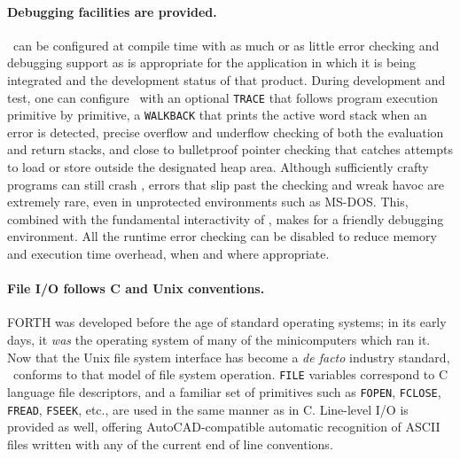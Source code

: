 \documentclass[twocolumn]{article}
\begin{document}
\paragraph{Debugging facilities are provided.}  \atlast\ can be
configured at compile time with as much or as little error checking
and debugging support as is appropriate for the application in which
it is being integrated and the development status of that product.
During development and test, one can configure \atlast\ with an
optional {\tt TRACE} that follows program execution primitive by
primitive, a {\tt WALKBACK} that prints the active word stack when an
error is detected, precise overflow and underflow checking of both the
evaluation and return stacks, and close to bulletproof pointer
checking that catches attempts to load or store outside the designated
heap area.  Although sufficiently crafty programs can still crash
\atlast , errors that slip past the checking and wreak havoc are
extremely rare, even in unprotected environments such as MS-DOS\@.
This, combined with the fundamental interactivity of \atlast ,
makes for a friendly debugging environment.  All the runtime error
checking can be disabled to reduce memory and execution time overhead,
when and where appropriate.

\paragraph{File I/O follows C and Unix conventions.}  FORTH was
developed before the age of standard operating systems; in its early
days, it {\em was} the operating system of many of the minicomputers
which ran it.  Now that the Unix file system interface has become a {\em de
facto} industry standard, \atlast\ conforms to that model of file
system operation.  {\tt FILE} variables correspond to C language file
descriptors, and a familiar set of primitives such as {\tt FOPEN},
{\tt FCLOSE}, {\tt FREAD}, {\tt FSEEK}, etc., are used in the same
manner as in C\@.  Line-level I/O is provided as well, offering
AutoCAD-compatible automatic recognition of ASCII files written with any
of the current end of line conventions.
\end{document}
